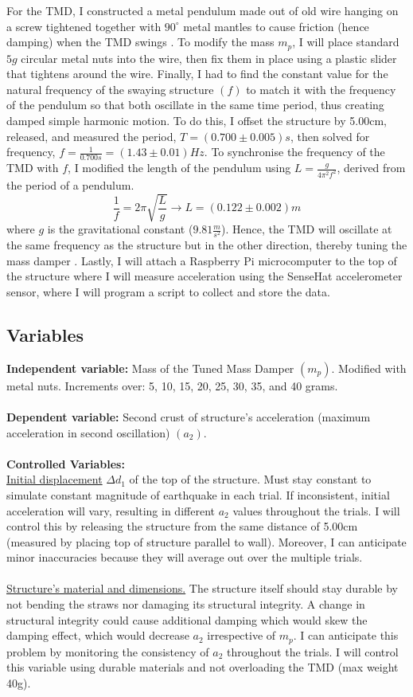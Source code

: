 \documentclass[11pt]{article}
\begin{document}
For the TMD, I constructed a metal pendulum made out of old wire hanging on a screw tightened together with $90^{\circ}$ metal mantles to cause friction (hence damping) when the TMD swings \autocite{lourenco}. To modify the mass $m_p$, I will place standard $5g$ circular metal nuts into the wire, then fix them in place using a plastic slider that tightens around the wire. Finally, I had to find the constant value for the natural frequency of the swaying structure $(f)$ to match it with the frequency of the pendulum so that both oscillate in the same time period, thus creating damped simple harmonic motion. To do this, I offset the structure by 5.00cm, released, and measured the period, $T=(0.700\pm 0.005)s$, then solved for frequency, $f=\frac{1}{0.700s}=(1.43\pm0.01)Hz$. To synchronise the frequency of the TMD with $f$, I modified the length of the pendulum using $L=\frac{g}{4\pi^2f^2}$, derived from the period of a pendulum. $$\frac{1}{f}=2\pi\sqrt{\frac{L}{g}} \rightarrow L=(0.122\pm0.002)m$$ where $g$ is the gravitational constant ($9.81 \frac{m}{s^2}$). Hence, the TMD will oscillate at the same frequency as the structure but in the other direction, thereby tuning the mass damper \autocite{connor}. Lastly, I will attach a Raspberry Pi microcomputer to the top of the structure where I will measure acceleration using the SenseHat accelerometer sensor, where I will program a script to collect and store the data.

\subsection{Variables} 

\textbf{Independent variable: }
Mass of the Tuned Mass Damper $(m_p)$. Modified with metal nuts. Increments over: 5, 10, 15, 20, 25, 30, 35, and 40 grams.
\\ \\
\textbf{Dependent variable:} 
Second crust of structure's acceleration (maximum acceleration in second oscillation) $(a_2)$.
\\ \\
\textbf{Controlled Variables:}
\\ \underline{Initial displacement} $\Delta d_1$ of the top of the structure. Must stay constant to simulate constant magnitude of earthquake in each trial. If inconsistent, initial acceleration will vary, resulting in different $a_2$ values throughout the trials. I will control this by releasing the structure from the same distance of 5.00cm (measured by placing top of structure parallel to wall). Moreover, I can anticipate minor inaccuracies because they will average out over the multiple trials.
\\ \\ \underline{Structure’s material and dimensions.} The structure itself should stay durable by not bending the straws nor damaging its structural integrity. A change in structural integrity could cause additional damping which would skew the damping effect, which would decrease $a_2$ irrespective of $m_p$. I can anticipate this problem by monitoring the consistency of $a_2$ throughout the trials. I will control this variable using durable materials and not overloading the TMD (max weight 40g). 
\end{document}
